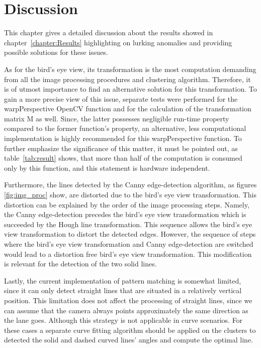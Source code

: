\documentclass[Report.tex]{subfiles}
\begin{document}
\chapter{Discussion}
\label{chapter:Discussion}

This chapter gives a detailed discussion about the results showed in
chapter~\ref{chapter:Results} highlighting on lurking anomalies and providing
possible solutions for these issues.

As for the bird's eye view, its transformation is the most computation
demanding from all the image processing procedures and clustering algorithm.
Therefore, it is of utmost importance to find an alternative solution for this
transformation. To gain a more precise view of this issue, separate tests were
performed for the warpPerspective OpenCV function and for the calculation of
the transformation matrix M as well. Since, the latter possesses negligible
run-time property compared to the former function's property, an alternative,
less computational implementation is highly recommended for this
warpPerspective function. To further emphasize the significance of this matter,
it must be pointed out, as table~\ref{tab:result} shows, that more than half of
the computation is consumed only by this function, and this statement is
hardware independent.

Furthermore, the lines detected by the Canny edge-detection algorithm, as
figures \ref{fig:img_proc} show, are distorted due to the bird's eye view
transformation. This distortion can be explained by the order of the image
processing steps. Namely, the Canny edge-detection precedes the bird's eye view
transformation which is succeeded by the Hough line transformation. This
sequence allows the bird's eye view transformation to distort the detected
edges. However, the sequence of steps where the bird's eye view transformation
and Canny edge-detection are switched would lead to a distortion free bird's
eye view transformation. This modification is relevant for the detection of the
two solid lines.

Lastly, the current implementation of pattern matching is somewhat limited,
since it can only detect straight lines that are situated in a relatively
vertical position. This limitation does not affect the processing of straight
lines, since we can assume that the camera always points approximately the same
direction as the lane goes. Although this strategy is not applicable in curve
scenarios. For these cases a separate curve fitting algorithm should be applied
on the clusters to detected the solid and dashed curved lines' angles and
compute the optimal line.
\end{document}
